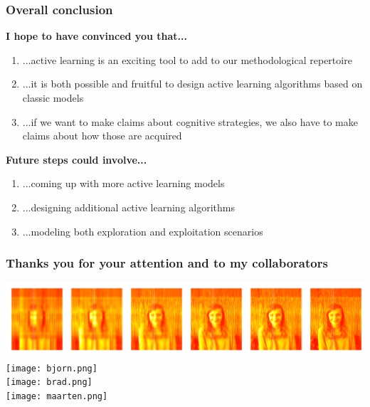\documentclass{beamer}
\begin{document}
\begin{frame}
 \frametitle{Overall conclusion}
\textbf{I hope to have convinced you that...}
\begin{enumerate}
\item ...active learning is an exciting tool to add to our methodological repertoire
\item ...it is both possible and fruitful to design active learning algorithms based on classic models
\item ...if we want to make claims about cognitive strategies, we also have to make claims about how those are acquired
\end{enumerate}
\textbf{Future steps could involve...}
\begin{enumerate}
\item ...coming up with more active learning models
\item ...designing additional active learning algorithms
\item ...modeling both exploration and exploitation scenarios
\end{enumerate}
\end{frame}

\begin{frame}
 \frametitle{Thanks you for your attention and to my collaborators}
\vspace{-0.3cm}
\begin{center}
\includegraphics[scale=0.1]{paula.png}\\
\texttt{[image: bjorn.png]}\\
\texttt{[image: brad.png]}\\
\texttt{[image: maarten.png]}
\end{center}
\end{frame}
\end{document}
